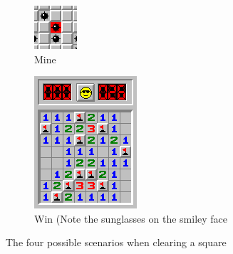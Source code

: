 \begin{figure}[h]
\begin{subfigure}[t]{0.2\textwidth}
        \includegraphics[width=0.8\linewidth]{figures/2.1/mine}
        \caption{Mine}
    \end{subfigure}
    \begin{subfigure}[t]{0.2\textwidth}
        \centering
        \includegraphics[width=0.8\linewidth]{figures/2.1/win}
        \caption{Win (Note the sunglasses on the smiley face}
    \end{subfigure}
    \caption{The four possible scenarios when clearing a square}
\end{figure}


